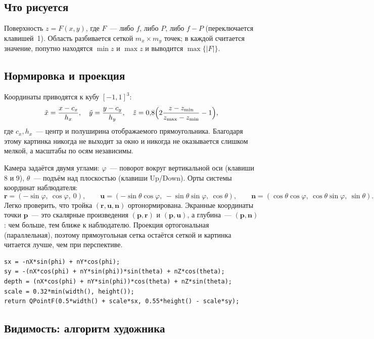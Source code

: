 \documentclass[11pt,a4paper]{report}
\begin{document}
\subsection{Что рисуется}

Поверхность $z=F(x,y)$, где $F$~--- либо $f$, либо $P$, либо $f-P$
(переключается клавишей~1). Область разбивается сеткой $m_x\times m_y$ точек;
в каждой считается значение, попутно находятся $\min z$ и $\max z$ и
выводится $\max\{|F|\}$.

\subsection{Нормировка и проекция}

Координаты приводятся к кубу $[-1,1]^3$:
\[
\tilde x=\frac{x-c_x}{h_x},\quad
\tilde y=\frac{y-c_y}{h_y},\quad
\tilde z=0{,}8\Bigl(2\frac{z-z_{\min}}{z_{\max}-z_{\min}}-1\Bigr),
\]
где $c_x,h_x$~--- центр и полуширина отображаемого прямоугольника. Благодаря
этому картинка никогда не выходит за окно и никогда не оказывается слишком
мелкой, а масштабы по осям независимы.

Камера задаётся двумя углами: $\varphi$~--- поворот вокруг вертикальной оси
(клавиши 8 и 9), $\theta$~--- подъём над плоскостью (клавиши Up/Down). Орты
системы координат наблюдателя:
\[
\mathbf r=(-\sin\varphi,\ \cos\varphi,\ 0),\qquad
\mathbf u=(-\sin\theta\cos\varphi,\ -\sin\theta\sin\varphi,\ \cos\theta),\qquad
\mathbf n=(\cos\theta\cos\varphi,\ \cos\theta\sin\varphi,\ \sin\theta).
\]
Легко проверить, что тройка $(\mathbf r,\mathbf u,\mathbf n)$ ортонормирована.
Экранные координаты точки $\mathbf p$~--- это скалярные произведения
$(\mathbf p,\mathbf r)$ и $(\mathbf p,\mathbf u)$, а глубина~---
$(\mathbf p,\mathbf n)$: чем больше, тем ближе к наблюдателю. Проекция
ортогональная (параллельная), поэтому прямоугольная сетка остаётся сеткой и
картинка читается лучше, чем при перспективе.
\begin{lstlisting}[style=cpp]
sx = -nX*sin(phi) + nY*cos(phi);
sy = -(nX*cos(phi) + nY*sin(phi))*sin(theta) + nZ*cos(theta);
depth = (nX*cos(phi) + nY*sin(phi))*cos(theta) + nZ*sin(theta);
scale = 0.32*min(width(), height());
return QPointF(0.5*width() + scale*sx, 0.55*height() - scale*sy);
\end{lstlisting}

\subsection{Видимость: алгоритм художника}
\end{document}
